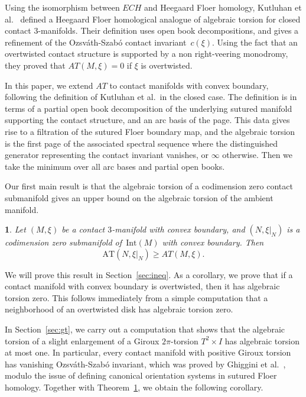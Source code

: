 \documentclass[11pt,oneside,english]{amsart}
\numberwithin{equation}{section}
\numberwithin{figure}{section}
\theoremstyle{definition}
\theoremstyle{plain}
\newtheorem{thm}{\protect\theoremname}
\theoremstyle{plain}
\theoremstyle{remark}
\theoremstyle{plain}
\providecommand{\theoremname}{Theorem}
\begin{document}
Using the isomorphism between ${\mathit{ECH}}$ and Heegaard Floer homology, Kutluhan et al.~\cite{key-10}
defined a Heegaard Floer homological analogue of algebraic torsion for closed contact 3-manifolds.
Their definition uses open book decompositions, and gives a refinement of the
Ozsv\'ath-Szab\'o contact invariant~$c(\xi)$. Using the fact that an overtwisted contact structure
is supported by a non right-veering monodromy, they proved that ${\mathit{AT}}(M,\xi) = 0$ if
$\xi$ is overtwisted.

In this paper, we extend ${\mathit{AT}}$ to contact manifolds with convex boundary,
following the definition of Kutluhan et al.~in the closed case.
The definition is in terms of a partial open book decomposition of
the underlying sutured manifold supporting the contact structure,
and an arc basis of the page. This data gives rise to a filtration of
the sutured Floer boundary map, and the algebraic torsion is the first
page of the associated spectral sequence where the distinguished generator
representing the contact invariant vanishes, or $\infty$ otherwise. Then
we take the minimum over all arc bases and partial open books.

Our first main result is that the algebraic torsion of a codimension zero contact submanifold
gives an upper bound on the algebraic torsion of the ambient manifold.

\begin{thm} \label{thm:ineq}
Let $(M,\xi)$ be a contact $3$-manifold with convex boundary,
and $(N,\xi|_N)$ is a codimension zero submanifold of~$\text{Int}(M)$ with convex boundary.
Then
\[
\mbox{AT}(N,\xi|_N) \ge {\mathit{AT}}(M,\xi).
\]
\end{thm}

We will prove this result in Section~\ref{sec:ineq}.
As a corollary, we prove that if a contact manifold with convex boundary
is overtwisted, then it has algebraic torsion zero. This follows
immediately from a simple computation that a neighborhood of an overtwisted
disk has algebraic torsion zero.

In Section~\ref{sec:gt}, we carry out a computation that shows that the algebraic torsion
of a slight enlargement of a Giroux $2\pi$-torsion $T^2 \times I$
has algebraic torsion at most one. In particular, every contact manifold
with positive Giroux torsion has vanishing Ozsv\'ath-Szab\'o invariant,
which was proved by Ghiggini et al.~\cite{key-5}, modulo the issue of
defining canonical orientation systems in sutured Floer homology.
Together with Theorem~\ref{thm:ineq}, we obtain the following corollary.
\end{document}
